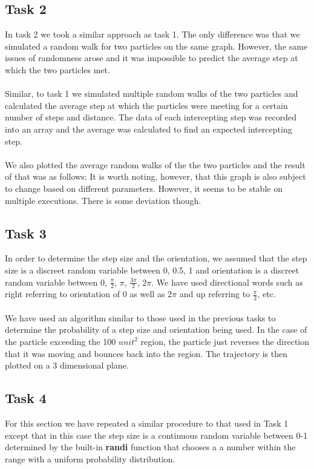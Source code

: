 \documentclass{article}
\begin{document}
\subsection{Task 2}
In task 2 we took a similar approach as task 1. The only difference was that we simulated a random walk 
for two particles on the same graph. However, the same issues of randomness arose and it was impossible to
predict the average step at which the two particles met. 
\\\\
Similar, to task 1 we simulated multiple random walks of the two particles and calculated the average step 
at which the particles were meeting for a certain number of steps and distance. The data of each intercepting 
step was recorded into an array and the average was calculated to find an expected intercepting step.
\\\\
We also plotted the average random walks of the the two particles and the result of that was as follows:
It is worth noting, however, that this graph is also subject to change based on different parameters. However, 
it seems to be stable on multiple executions. There is some deviation though. 
\subsection{Task 3}
In order to determine the step size and the orientation, we assumed that the step size is a discreet random variable between {0, 0.5, 1} and orientation is a discreet random variable between {0, $\frac{\pi}{2}$, $\pi$, $\frac{3\pi}{2}$, $2\pi$}. We have used directional words such as right referring to orientation of 0 as well as $2\pi$ and up referring to $\frac{\pi}{2}$, etc. 
\\\\
We have used an algorithm similar to those used in the previous tasks to determine the probability of a step size and orientation being used. In the case of the particle exceeding the 100 $unit^{2}$ region, the particle just reverses the direction that it was moving and bounces back into the region. The trajectory is then plotted on a 3 dimensional plane.
\subsection{Task 4}
For this section we have repeated a similar procedure to that used in Task 1 except that in this case the step size is a continuous random variable between 0-1 determined by the built-in \textbf{randi} function that chooses a a number within the range with a uniform probability distribution.
\end{document}
